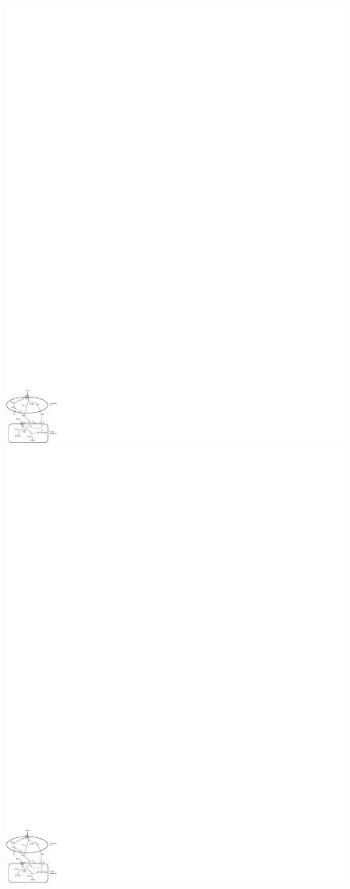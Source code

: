 \documentclass[3p,times,procedia]{elsarticle}
\begin{document}
\begin{figure}[h]
\centerline{\includegraphics{fx1}\hspace*{5mm}\includegraphics{fx1}}

\end{figure}
\end{document}

